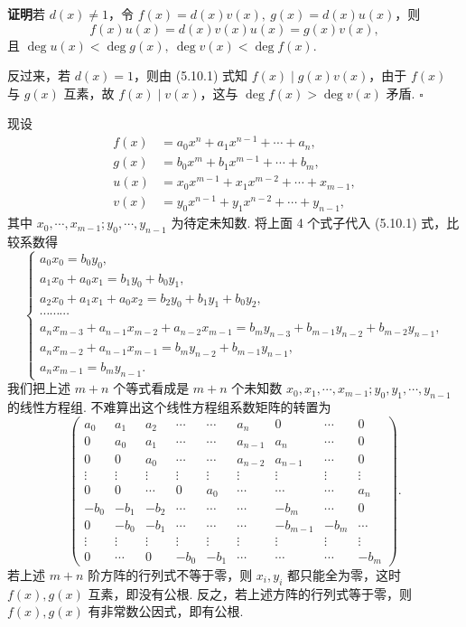 \documentclass[UTF8,12pt,a4paper,fontset=fandol]{ctexart}
\begin{document}
\noindent\textbf{证明}\quad 若 $d(x)\neq 1$，令 $f(x)=d(x)v(x),\ g(x)=d(x)u(x)$，则
\[
f(x)u(x)=d(x)v(x)u(x)=g(x)v(x),
\]
且 $\deg u(x)<\deg g(x),\ \deg v(x)<\deg f(x)$.

反过来，若 $d(x)=1$，则由 (5.10.1) 式知 $f(x)\mid g(x)v(x)$，由于 $f(x)$ 与 $g(x)$ 互素，故 $f(x)\mid v(x)$，这与 $\deg f(x)>\deg v(x)$ 矛盾. $\square$

现设
\[
\begin{aligned}
f(x)&=a_0x^n+a_1x^{n-1}+\cdots+a_n,\\
g(x)&=b_0x^m+b_1x^{m-1}+\cdots+b_m,\\
u(x)&=x_0x^{m-1}+x_1x^{m-2}+\cdots+x_{m-1},\\
v(x)&=y_0x^{n-1}+y_1x^{n-2}+\cdots+y_{n-1},
\end{aligned}
\]
其中 $x_0,\cdots,x_{m-1};y_0,\cdots,y_{n-1}$ 为待定未知数. 将上面 4 个式子代入 (5.10.1) 式，比较系数得
\[
\begin{cases}
a_0x_0=b_0y_0,\\
a_1x_0+a_0x_1=b_1y_0+b_0y_1,\\
a_2x_0+a_1x_1+a_0x_2=b_2y_0+b_1y_1+b_0y_2,\\
\cdots\cdots\cdots\\
a_nx_{m-3}+a_{n-1}x_{m-2}+a_{n-2}x_{m-1}=b_my_{n-3}+b_{m-1}y_{n-2}+b_{m-2}y_{n-1},\\
a_nx_{m-2}+a_{n-1}x_{m-1}=b_my_{n-2}+b_{m-1}y_{n-1},\\
a_nx_{m-1}=b_my_{n-1}.
\end{cases}
\]
我们把上述 $m+n$ 个等式看成是 $m+n$ 个未知数 $x_0,x_1,\cdots,x_{m-1};y_0,y_1,\cdots,y_{n-1}$ 的线性方程组. 不难算出这个线性方程组系数矩阵的转置为
\[
\begin{pmatrix}
a_0&a_1&a_2&\cdots&\cdots&a_n&0&\cdots&0\\
0&a_0&a_1&\cdots&\cdots&a_{n-1}&a_n&\cdots&0\\
0&0&a_0&\cdots&\cdots&a_{n-2}&a_{n-1}&\cdots&0\\
\vdots&\vdots&\vdots&\vdots&\vdots&\vdots&\vdots&\vdots&\vdots\\
0&0&\cdots&0&a_0&\cdots&\cdots&\cdots&a_n\\
-b_0&-b_1&-b_2&\cdots&\cdots&\cdots&-b_m&\cdots&0\\
0&-b_0&-b_1&\cdots&\cdots&\cdots&-b_{m-1}&-b_m&\cdots\\
\vdots&\vdots&\vdots&\vdots&\vdots&\vdots&\vdots&\vdots&\vdots\\
0&\cdots&0&-b_0&-b_1&\cdots&\cdots&\cdots&-b_m
\end{pmatrix}.
\]
若上述 $m+n$ 阶方阵的行列式不等于零，则 $x_i,y_i$ 都只能全为零，这时 $f(x),g(x)$ 互素，即没有公根. 反之，若上述方阵的行列式等于零，则 $f(x),g(x)$ 有非常数公因式，即有公根.
\end{document}
